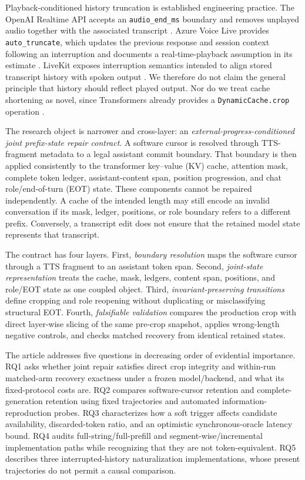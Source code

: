 Playback-conditioned history truncation is established engineering practice. The OpenAI Realtime API accepts an \texttt{audio\_end\_ms} boundary and removes unplayed audio together with the associated transcript \citep{openaiRealtimeConversations}. Azure Voice Live provides \texttt{auto\_truncate}, which updates the previous response and session context following an interruption and documents a real-time-playback assumption in its estimate \citep{microsoftVoiceLiveAutoTruncation2026}. LiveKit exposes interruption semantics intended to align stored transcript history with spoken output \citep{livekitEventsErrorHandling}. We therefore do not claim the general principle that history should reflect played output. Nor do we treat cache shortening as novel, since Transformers already provides a \texttt{DynamicCache.crop} operation \citep{huggingFace2025TransformersCacheUtils,huggingFace2025KVCacheStrategies}.

The research object is narrower and cross-layer: an \emph{external-progress-conditioned joint prefix-state repair contract}. A software cursor is resolved through TTS-fragment metadata to a legal assistant commit boundary. That boundary is then applied consistently to the transformer key--value (KV) cache, attention mask, complete token ledger, assistant-content span, position progression, and chat role/end-of-turn (EOT) state. These components cannot be repaired independently. A cache of the intended length may still encode an invalid conversation if its mask, ledger, positions, or role boundary refers to a different prefix. Conversely, a transcript edit does not ensure that the retained model state represents that transcript.

The contract has four layers. First, \emph{boundary resolution} maps the software cursor through a TTS fragment to an assistant token span. Second, \emph{joint-state representation} treats the cache, mask, ledgers, content span, positions, and role/EOT state as one coupled object. Third, \emph{invariant-preserving transitions} define cropping and role reopening without duplicating or misclassifying structural EOT. Fourth, \emph{falsifiable validation} compares the production crop with direct layer-wise slicing of the same pre-crop snapshot, applies wrong-length negative controls, and checks matched recovery from identical retained states.

The article addresses five questions in decreasing order of evidential importance. RQ1 asks whether joint repair satisfies direct crop integrity and within-run matched-arm recovery exactness under a frozen model/backend, and what its fixed-protocol costs are. RQ2 compares software-cursor retention and complete-generation retention using fixed trajectories and automated information-reproduction probes. RQ3 characterizes how a soft trigger affects candidate availability, discarded-token ratio, and an optimistic synchronous-oracle latency bound. RQ4 audits full-string/full-prefill and segment-wise/incremental implementation paths while recognizing that they are not token-equivalent. RQ5 describes three interrupted-history naturalization implementations, whose present trajectories do not permit a causal comparison.

